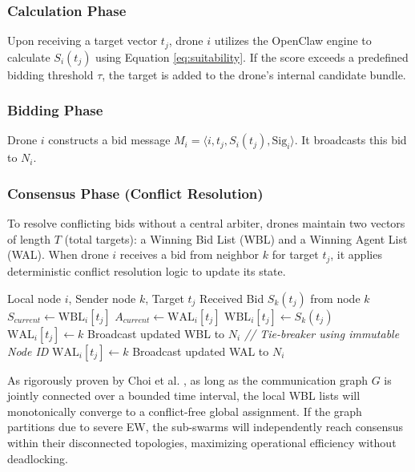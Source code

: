 \subsubsection{Calculation Phase}
Upon receiving a target vector $t_j$, drone $i$ utilizes the OpenClaw engine to calculate $S_i(t_j)$ using Equation \ref{eq:suitability}. If the score exceeds a predefined bidding threshold $\tau$, the target is added to the drone's internal candidate bundle. 

\subsubsection{Bidding Phase}
Drone $i$ constructs a bid message $M_i = \langle i, t_j, S_i(t_j), \text{Sig}_i \rangle$. It broadcasts this bid to $N_i$. 

\subsubsection{Consensus Phase (Conflict Resolution)}
To resolve conflicting bids without a central arbiter, drones maintain two vectors of length $T$ (total targets): a Winning Bid List (WBL) and a Winning Agent List (WAL). When drone $i$ receives a bid from neighbor $k$ for target $t_j$, it applies deterministic conflict resolution logic to update its state.

\begin{algorithm}[H]
\caption{Decentralized Conflict Resolution}
\label{alg:consensus}
\begin{algorithmic}[1]
\REQUIRE Local node $i$, Sender node $k$, Target $t_j$
\REQUIRE Received Bid $S_k(t_j)$ from node $k$
\STATE $S_{current} \leftarrow \text{WBL}_i[t_j]$
\STATE $A_{current} \leftarrow \text{WAL}_i[t_j]$
    \STATE $\text{WBL}_i[t_j] \leftarrow S_k(t_j)$
    \STATE $\text{WAL}_i[t_j] \leftarrow k$
    \STATE Broadcast updated WBL to $N_i$
        \STATE \textit{// Tie-breaker using immutable Node ID}
        \STATE $\text{WAL}_i[t_j] \leftarrow k$
        \STATE Broadcast updated WAL to $N_i$
    \ENDIF
\ENDIF
\end{algorithmic}
\end{algorithm}

As rigorously proven by Choi et al. \cite{choi2009}, as long as the communication graph $G$ is jointly connected over a bounded time interval, the local WBL lists will monotonically converge to a conflict-free global assignment. If the graph partitions due to severe EW, the sub-swarms will independently reach consensus within their disconnected topologies, maximizing operational efficiency without deadlocking.

